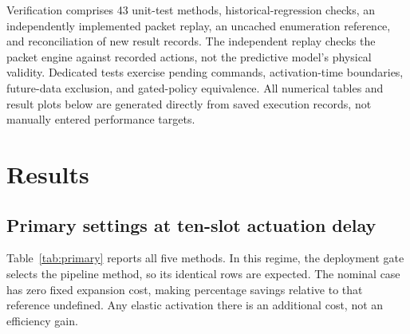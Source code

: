 \documentclass[10pt,a4paper]{article}
\begin{document}
Verification comprises 43 unit-test methods, historical-regression
checks, an independently implemented packet replay, an uncached enumeration
reference, and reconciliation of new result records. The independent replay
checks the packet engine against recorded actions, not the predictive model's
physical validity. Dedicated tests exercise pending commands, activation-time
boundaries, future-data exclusion, and gated-policy equivalence. All numerical
tables and result plots below are generated directly from saved execution
records, not manually entered performance targets.

\section{Results}
\subsection{Primary settings at ten-slot actuation delay}
Table~\ref{tab:primary} reports all five methods. In this regime, the deployment
gate selects the pipeline method, so its identical rows are expected. The
nominal case has zero fixed expansion cost, making percentage savings relative
to that reference undefined. Any elastic activation there is an additional
cost, not an efficiency gain.
\end{document}

